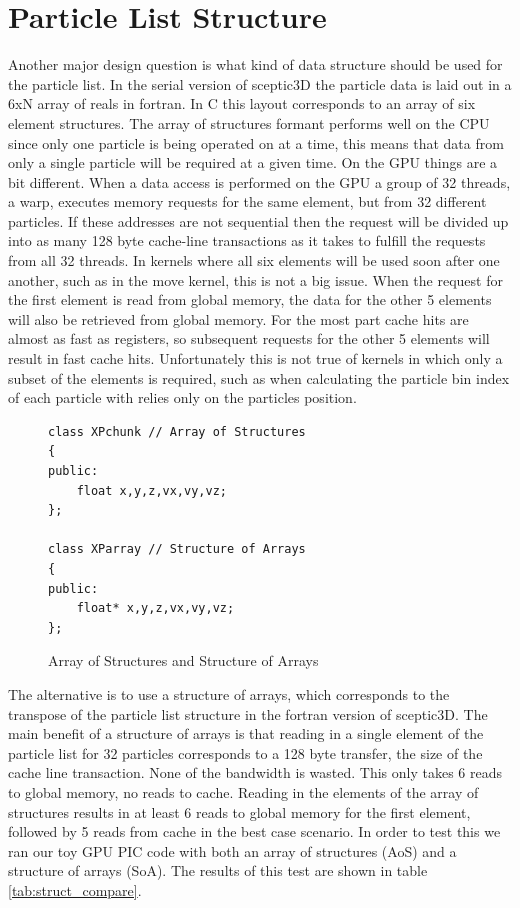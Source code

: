 	\section{Particle List Structure}

Another major design question is what kind of data structure should be used for the particle list. In the serial version of sceptic3D the particle data is laid out in a 6xN array of reals in fortran. In C this layout corresponds to an array of six element structures. The array of structures formant performs well on the CPU since only one particle is being operated on at a time, this means that data from only a single particle will be required at a given time. On the GPU things are a bit different. When a data access is performed on the GPU a group of 32 threads, a warp, executes memory requests for the same element, but from 32 different particles. If these addresses are not sequential then the request will be divided up into as many 128 byte cache-line transactions as it takes to fulfill the requests from all 32 threads. In kernels where all six elements will be used soon after one another, such as in the move kernel, this is not a big issue. When the request for the first element is read from global memory, the data for the other 5 elements will also be retrieved from global memory. For the most part cache hits are almost as fast as registers, so subsequent requests for the other 5 elements will result in fast cache hits. Unfortunately this is not true of kernels in which only a subset of the elements is required, such as when calculating the particle bin index of each particle with relies only on the particles position. \cite{NVIDIACorporation2011}

\begin{figure}
\begin{lstlisting}[frame=single]
class XPchunk // Array of Structures
{
public:
	float x,y,z,vx,vy,vz;
};

class XParray // Structure of Arrays
{
public:
	float* x,y,z,vx,vy,vz;
};
\end{lstlisting}
\caption{Array of Structures and Structure of Arrays}
\end{figure}   
	
	The alternative is to use a structure of arrays, which corresponds to the transpose of the particle list structure in the fortran version of sceptic3D. The main benefit of a structure of arrays is that reading in a single element of the particle list for 32 particles corresponds to a 128 byte transfer, the size of the cache line transaction. None of the bandwidth is wasted. This only takes 6 reads to global memory, no reads to cache. Reading in the elements of the array of structures results in at least 6 reads to global memory for the first element, followed by 5 reads from cache in the best case scenario. In order to test this we ran our toy GPU PIC code with both an array of structures (AoS) and a structure of arrays (SoA). The results of this test are shown in table \ref{tab:struct_compare}. 
	


